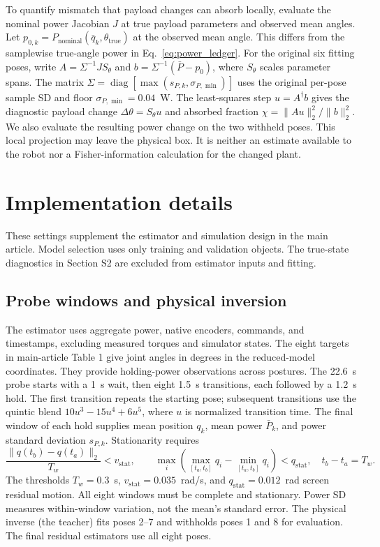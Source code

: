 \documentclass[12pt,a4paper]{article}
\begin{document}
To quantify mismatch that payload changes can absorb locally, evaluate
the nominal power Jacobian $J$ at true payload parameters and observed mean
angles. Let $p_{0,k}=P_{\mathrm{nominal}}(\bar q_k,\theta_{\mathrm{true}})$
at the observed mean angle. This differs from the samplewise true-angle
power in Eq.~\eqref{eq:power_ledger}. For the original six fitting poses,
write $A=\Sigma^{-1}JS_\theta$ and $b=\Sigma^{-1}(\bar P-p_0)$, where
$S_\theta$ scales parameter spans. The matrix
$\Sigma=\operatorname{diag}[\max(s_{P,k},\sigma_{P,\min})]$ uses the original
per-pose sample SD and floor $\sigma_{P,\min}=0.04$~W.
The least-squares step $u=A^\dagger b$ gives the diagnostic payload change
$\Delta\theta=S_\theta u$ and absorbed fraction
$\chi=\|Au\|_2^2/\|b\|_2^2$. We also evaluate the resulting power change on
the two withheld poses. This local projection may leave the physical box.
It is neither an estimate available to the robot nor a Fisher-information
calculation for the changed plant.

\section{Implementation details}
These settings supplement the estimator and simulation design in the main
article. Model selection uses only training and validation objects. The
true-state diagnostics in Section S2 are excluded from estimator inputs
and fitting.

\subsection{Probe windows and physical inversion}
The estimator uses aggregate power, native encoders, commands, and
timestamps, excluding measured torques and simulator states. The eight
targets in main-article Table 1 give joint angles in degrees in the
reduced-model coordinates. They provide holding-power observations across
postures. The 22.6~s probe starts with a 1~s wait, then eight 1.5~s
transitions, each followed by a 1.2~s hold. The first transition repeats the
starting pose; subsequent transitions use the quintic blend
$10u^3-15u^4+6u^5$, where $u$ is normalized transition time. The final
window of each hold supplies mean position $q_k$, mean power $\bar P_k$,
and power standard deviation $s_{P,k}$. Stationarity requires
\begin{equation}
 \frac{\|q(t_b)-q(t_a)\|_2}{T_w}<v_{\mathrm{stat}},\qquad
 \max_i\left(\max_{[t_a,t_b]}q_i-\min_{[t_a,t_b]}q_i\right)<q_{\mathrm{stat}},
 \quad t_b-t_a=T_w.
 \label{eq:stationarity_thresholds}
\end{equation}
The thresholds $T_w=0.3$~s, $v_{\mathrm{stat}}=0.035$~rad/s, and
$q_{\mathrm{stat}}=0.012$~rad screen residual motion. All eight windows
must be complete and stationary. Power SD measures within-window variation,
not the mean's standard error. The physical inverse (the teacher) fits poses 2--7 and
withholds poses 1 and 8 for evaluation. The final residual estimators use
all eight poses.
\end{document}
